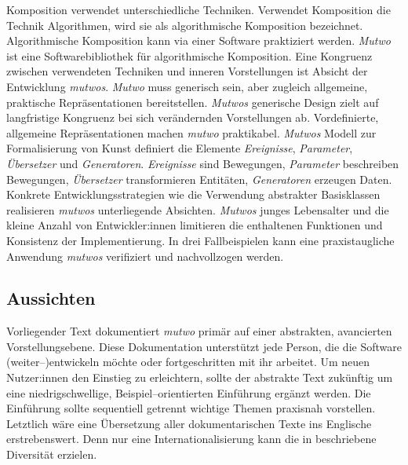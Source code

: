 \documentclass[12pt,a4paper,ngerman]{article}
\begin{document}
Komposition verwendet unterschiedliche Techniken.
Verwendet Komposition die Technik Algorithmen, wird sie als algorithmische Komposition bezeichnet.
Algorithmische Komposition kann via einer Software praktiziert werden.
\emph{Mutwo} ist eine Softwarebibliothek für algorithmische Komposition.
Eine Kongruenz zwischen verwendeten Techniken und inneren Vorstellungen ist Absicht der Entwicklung \emph{mutwos}.
\emph{Mutwo} muss generisch sein, aber zugleich allgemeine, praktische Repräsentationen bereitstellen.
\emph{Mutwos} generische Design zielt auf langfristige Kongruenz bei sich verändernden Vorstellungen ab.
Vordefinierte, allgemeine Repräsentationen machen \emph{mutwo} praktikabel.
\emph{Mutwos} Modell zur Formalisierung von Kunst definiert die Elemente \emph{Ereignisse}, \emph{Parameter}, \emph{Übersetzer} und \emph{Generatoren}.
\emph{Ereignisse} sind Bewegungen, \emph{Parameter} beschreiben Bewegungen, \emph{Übersetzer} transformieren Entitäten, \emph{Generatoren} erzeugen Daten.
Konkrete Entwicklungsstrategien wie die Verwendung abstrakter Basisklassen realisieren \emph{mutwos} unterliegende Absichten.
\emph{Mutwos} junges Lebensalter und die kleine Anzahl von Entwickler:innen limitieren die enthaltenen Funktionen und Konsistenz der Implementierung.
In drei Fallbeispielen kann eine praxistaugliche Anwendung \emph{mutwos} verifiziert und nachvollzogen werden.

\subsection{Aussichten}
Vorliegender Text dokumentiert \emph{mutwo} primär auf einer abstrakten, avancierten Vorstellungsebene.
Diese Dokumentation unterstützt jede Person, die die Software (weiter--)entwickeln möchte oder fortgeschritten mit ihr arbeitet.
Um neuen Nutzer:innen den Einstieg zu erleichtern, sollte der abstrakte Text zukünftig um eine niedrigschwellige, Beispiel--orientierten Einführung ergänzt werden.
Die Einführung sollte sequentiell getrennt wichtige Themen praxisnah vorstellen.
Letztlich wäre eine Übersetzung aller dokumentarischen Texte ins Englische erstrebenswert.
Denn nur eine Internationalisierung kann die in \emph{} beschriebene Diversität erzielen.
\end{document}
